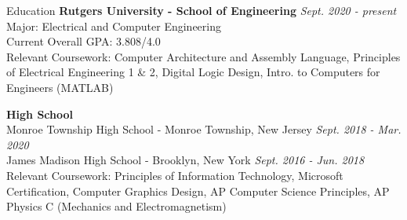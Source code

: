 \documentclass{resume}
\begin{document}


    \begin{rSection}{Education}
        {\bf Rutgers University - School of Engineering} \hfill {\em Sept. 2020 - present} \\
        Major: Electrical and Computer Engineering \\
        Current Overall GPA: 3.808/4.0 \\
        Relevant Coursework:
            Computer Architecture and Assembly Language,
            Principles of Electrical Engineering 1 \& 2,
            Digital Logic Design,
            Intro. to Computers for Engineers (MATLAB)

        {\bf High School}  \\
        Monroe Township High School - Monroe Township, New Jersey \hfill {\em Sept. 2018 - Mar. 2020} \\
        James Madison High School - Brooklyn, New York \hfill {\em Sept. 2016 - Jun. 2018} \\
        Relevant Coursework:
            Principles of Information Technology,
            Microsoft Certification,
            Computer Graphics Design,
            AP Computer Science Principles,
            AP Physics C (Mechanics and Electromagnetism)
    \end{rSection}

\end{document}
